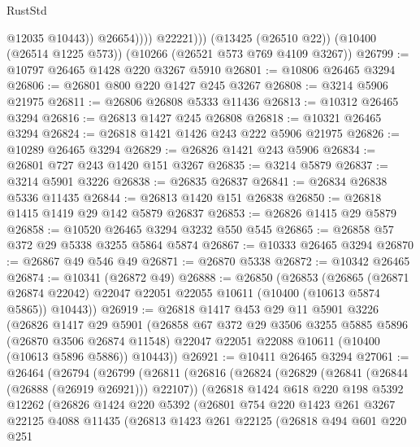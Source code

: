 \begin{lexlean}{RustStd}
\begin{coremodule}
{\begin{coremodule}
{{{{{{{{{{{{{{{{{{{{{{{{{                      @12035
                      @10443))
                  @26654))))
          @22221)))
    (@13425 (@26510 @22))
    (@10400 (@26514 @1225 @573))
    (@10266 (@26521 @573 @769 @4109 @3267))
@26799 := @10797 @26465 @1428 @220 @3267 @5910
@26801 := @10806 @26465 @3294
@26806 := @26801 @800 @220 @1427 @245 @3267
@26808 := @3214 @5906 @21975
@26811 := @26806 @26808 @5333 @11436
@26813 := @10312 @26465 @3294
@26816 := @26813 @1427 @245 @26808
@26818 := @10321 @26465 @3294
@26824 := @26818 @1421 @1426 @243 @222 @5906 @21975
@26826 := @10289 @26465 @3294
@26829 := @26826 @1421 @243 @5906
@26834 := @26801 @727 @243 @1420 @151 @3267
@26835 := @3214 @5879
@26837 := @3214 @5901 @3226
@26838 := @26835 @26837
@26841 := @26834 @26838 @5336 @11435
@26844 := @26813 @1420 @151 @26838
@26850 := @26818 @1415 @1419 @29 @142 @5879 @26837
@26853 := @26826 @1415 @29 @5879
@26858 := @10520 @26465 @3294 @3232 @550 @545
@26865 := @26858 @57 @372 @29 @5338 @3255 @5864 @5874
@26867 := @10333 @26465 @3294
@26870 := @26867 @49 @546 @49
@26871 := @26870 @5338
@26872 := @10342 @26465
@26874 := @10341 (@26872 @49)
@26888 := @26850
    (@26853
      (@26865
        (@26871 @26874 @22042)
        @22047
        @22051
        @22055
        @10611
        (@10400 (@10613 @5874 @5865))
        @10443))
@26919 := @26818
    @1417
    @453
    @29
    @11
    @5901
    @3226
    (@26826
      @1417
      @29
      @5901
      (@26858
        @67
        @372
        @29
        @3506
        @3255
        @5885
        @5896
        (@26870 @3506 @26874 @11548)
        @22047
        @22051
        @22088
        @10611
        (@10400 (@10613 @5896 @5886))
        @10443))
@26921 := @10411 @26465 @3294
@27061 := @26464
    (@26794
      (@26799
        (@26811
          (@26816
            (@26824
              (@26829 (@26841 (@26844 (@26888 (@26919 @26921))) @22107))
              (@26818
                @1424
                @618
                @220
                @198
                @5392
                @12262
                (@26826
                  @1424
                  @220
                  @5392
                  (@26801
                    @754
                    @220
                    @1423
                    @261
                    @3267
                    @22125
                    @4088
                    @11435
                    (@26813
                      @1423
                      @261
                      @22125
                      (@26818
                        @494
                        @601
                        @220
                        @251
}}}}}}}}}}}}}}}}}}}}}}}}}
\end{coremodule}}
\end{coremodule}
\end{lexlean}
